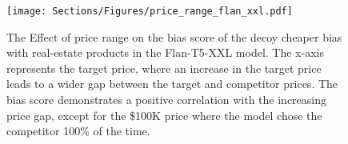 \begin{figure}[th!]
\centering
\texttt{[image: Sections/Figures/price\_range\_flan\_xxl.pdf]}
\caption{The Effect of price range on the bias score of the decoy cheaper bias with real-estate products in the Flan-T5-XXL model. The x-axis represents the target price, where an increase in the target price leads to a wider gap between the target and competitor prices. The bias score demonstrates a positive correlation with the increasing price gap, except for the \$100K price where the model chose the competitor 100\% of the time.}
\label{fig:decoy_prices_flan}
\end{figure}
